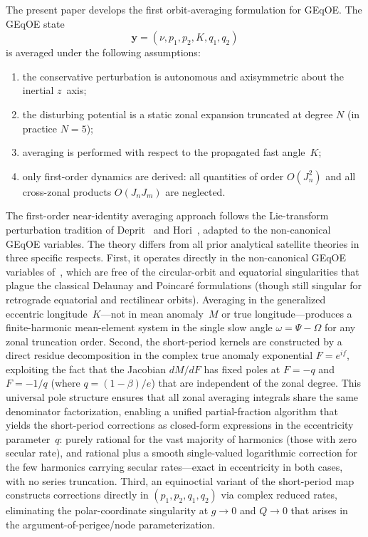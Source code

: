 The present paper develops the first orbit-averaging formulation for GEqOE.
The GEqOE state
\begin{equation}
\bm{y} = (\nu, p_1, p_2, K, q_1, q_2)
\end{equation}
is averaged under the following assumptions:
\begin{enumerate}
    \item the conservative perturbation is autonomous and axisymmetric about
    the inertial $z$~axis;
    \item the disturbing potential is a static zonal expansion truncated at
    degree $N$ (in practice $N = 5$);
    \item averaging is performed with respect to the propagated fast
    angle~$K$;
    \item only first-order dynamics are derived: all quantities of order
    $O(J_n^2)$ and all cross-zonal products $O(J_n J_m)$ are neglected.
\end{enumerate}
The first-order near-identity averaging approach follows the Lie-transform
perturbation tradition of Deprit~\cite{deprit1969} and
Hori~\cite{hori1966,hori1971}, adapted to the non-canonical GEqOE
variables.
The theory differs from all prior analytical satellite theories in three
specific respects.
First, it operates directly in the non-canonical GEqOE variables
of~\cite{bau2021}, which are free of the circular-orbit and equatorial
singularities that plague the classical Delaunay and Poincar\'e formulations
(though still singular for retrograde equatorial and rectilinear orbits).
Averaging in the generalized eccentric longitude~$K$---not in mean
anomaly~$M$ or true longitude---produces a finite-harmonic mean-element
system in the single slow angle $\omega = \Psi - \Omega$ for any zonal
truncation order.
Second, the short-period kernels are constructed by a direct residue
decomposition in the complex true anomaly exponential $F = e^{if}$,
exploiting the fact that the Jacobian $dM/dF$ has fixed poles at $F = -q$
and $F = -1/q$ (where $q = (1-\beta)/e$) that are independent of the zonal
degree.  This universal pole structure ensures that all zonal averaging
integrals share the same denominator factorization, enabling a unified
partial-fraction algorithm that yields the short-period corrections as
closed-form expressions in the eccentricity parameter~$q$: purely rational
for the vast majority of harmonics (those with zero secular rate), and
rational plus a smooth single-valued logarithmic correction for the few
harmonics carrying secular rates---exact in eccentricity in both cases,
with no series truncation.
Third, an equinoctial variant of the short-period map constructs corrections
directly in $(p_1, p_2, q_1, q_2)$ via complex reduced rates, eliminating
the polar-coordinate singularity at $g \to 0$ and $Q \to 0$ that arises in
the argument-of-perigee/node parameterization.

